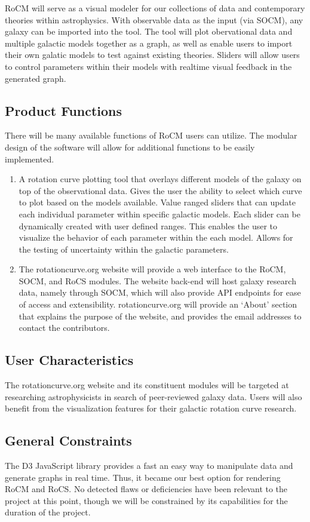 \documentclass[titlepage]{article}
\begin{document}
RoCM will serve as a visual modeler for our collections of data and contemporary theories within astrophysics. With observable data as the input (via SOCM), any galaxy can be imported into the tool. The tool will plot obervational data and multiple galactic models together as a graph, as well as enable users to import their own galatic models to test against existing theories. Sliders will allow users to control parameters within their models with realtime visual feedback in the generated graph.

\subsection{Product Functions}
There will be many available functions of RoCM users can utilize. The modular design of the software will allow for additional functions to be easily implemented.
\begin{enumerate}
	\item A rotation curve plotting tool that overlays different models of the galaxy on top of the observational data. Gives the user the ability to select which curve to plot based on the models available. Value ranged sliders that can update each individual parameter within specific galactic models. Each slider can be dynamically created with user defined ranges. This enables the user to visualize the behavior of each parameter within the each model. Allows for the testing of uncertainty within the galactic parameters.
	\item The rotationcurve.org website will provide a web interface to the RoCM, SOCM, and RoCS modules. The website back-end will host galaxy research data, namely through SOCM, which will also provide API endpoints for ease of access and extensibility. rotationcurve.org will provide an `About' section that explains the purpose of the website, and provides the email addresses to contact the contributors.
\end{enumerate}


\subsection{User Characteristics}
The rotationcurve.org website and its constituent modules will be targeted at researching astrophysicists in search of peer-reviewed galaxy data. Users will also benefit from the visualization features for their galactic rotation curve research. 

\subsection{General Constraints}
\label{General Constraints}
The D3 JavaScript library provides a fast an easy way to manipulate data and generate graphs in real time. Thus, it became our best option for rendering RoCM and RoCS. No detected flaws or deficiencies have been relevant to the project at this point, though we will be constrained by its capabilities for the duration of the project.
\end{document}
